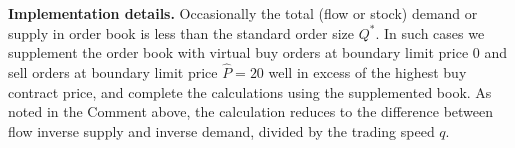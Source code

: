 \documentclass[12pt]{article}
\begin{document}
\begin{singlespace}
\noindent
\textbf{Implementation details.}
Occasionally the total (flow or stock) demand or supply in order book is less than the standard order size $Q^*.$
In such cases we supplement the order book with virtual buy orders at boundary limit price 0 and sell orders at boundary limit price $\hat{P} = 20$ well in excess of the highest buy contract price, and complete the calculations using the supplemented book. As noted in the Comment above, the calculation reduces to the difference between flow inverse supply and inverse demand, divided by the trading speed $q$.

\end{singlespace}
\end{document}
